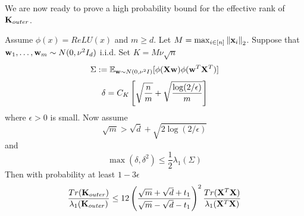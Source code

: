 \par
We are now ready to prove a high probability bound for the effective rank of $\mathbf{K}_{outer}$.
\begin{theorem}
Assume $\phi(x) = ReLU(x)$ and $m \geq d$.  Let $M = \max_{i \in [n]} \left\lVert\mathbf{x}_i\right\rVert_2$.  Suppose that $\mathbf{w}_1, \ldots, \mathbf{w}_m \sim N(0, \nu^2 I_d)$ i.i.d.  Set $K = M \nu \sqrt{n}$
\[\Sigma := \mathbb{E}_{\mathbf{w} \sim N(0, \nu^2 I)}[\phi(\mathbf{X} \mathbf{w}) \phi(\mathbf{w}^T \mathbf{X}^T)]\]
\[ \delta = C_K \left[\sqrt{\frac{n}{m}} + \sqrt{\frac{\log(2/\epsilon)}{m}}\right] \]
where $\epsilon > 0$ is small.  Now assume
\[ \sqrt{m} > \sqrt{d} + \sqrt{2 \log(2/\epsilon)}\]
and
\[ \max(\delta, \delta^2) \leq \frac{1}{2} \lambda_1(\Sigma) \]
Then with probability at least $1 - 3 \epsilon$
\[\frac{Tr(\mathbf{K}_{outer})}{\lambda_1(\mathbf{K}_{outer})}  \leq 12 \left(\frac{\sqrt{m} + \sqrt{d} + t_1}{\sqrt{m} - \sqrt{d} - t_1}\right)^2 \frac{Tr(\mathbf{X}^T \mathbf{X})}{\lambda_1(\mathbf{X}^T \mathbf{X})} \]
\end{theorem}
